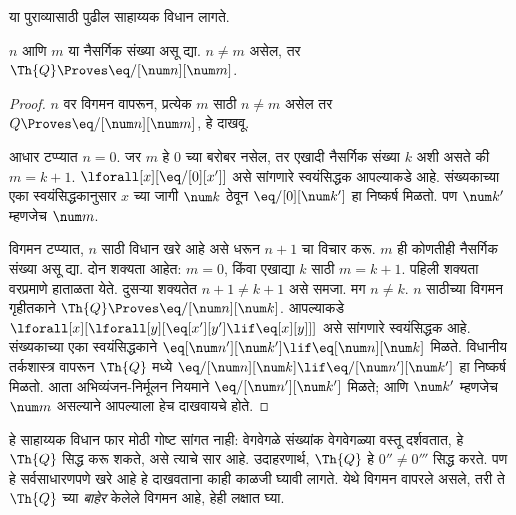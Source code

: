 \documentclass[../../../include/open-logic-section]{subfiles}
\begin{document}
या पुराव्यासाठी पुढील साहाय्यक विधान लागते.

\begin{lem}
 $n$ आणि $m$ या नैसर्गिक संख्या असू द्या.
$n \neq m$ असेल, तर $\Th{Q} \Proves \eq/[\num n][\num m]$.
\end{lem}

\begin{proof}
$n$ वर विगमन वापरून, प्रत्येक $m$ साठी $n \neq m$ असेल तर
$Q \Proves \eq/[\num n][\num m]$, हे दाखवू.

आधार टप्प्यात $n = 0$. जर $m$ हे $0$ च्या बरोबर नसेल,
तर एखादी नैसर्गिक संख्या $k$ अशी असते की $m = k +
1$. $\lforall[x][\eq/[0][x']]$ असे सांगणारे स्वयंसिद्धक
आपल्याकडे आहे. संख्यकाच्या एका स्वयंसिद्धकानुसार $x$ च्या जागी
$\num k$ ठेवून $\eq/[0][\num k']$ हा निष्कर्ष मिळतो. पण
$\num k'$ म्हणजेच $\num m$.

विगमन टप्प्यात, $n$ साठी विधान खरे आहे असे धरून $n+1$ चा
विचार करू. $m$ ही कोणतीही नैसर्गिक संख्या असू द्या. दोन शक्यता
आहेत: $m = 0$, किंवा एखाद्या $k$ साठी $m = k+1$. पहिली
शक्यता वरप्रमाणे हाताळता येते. दुसऱ्या शक्यतेत $n+1 \neq
k+1$ असे समजा. मग $n \neq k$. $n$ साठीच्या विगमन गृहीतकाने
$\Th{Q} \Proves \eq/[\num n][\num k]$. आपल्याकडे
$\lforall[x][\lforall[y][\eq[x'][y'] \lif \eq[x][y]]]$
असे सांगणारे स्वयंसिद्धक आहे. संख्यकाच्या एका स्वयंसिद्धकाने
$\eq[\num n'][\num k'] \lif \eq[\num n][\num
  k]$ मिळते. विधानीय तर्कशास्त्र वापरून $\Th{Q}$ मध्ये
$\eq/[\num n][\num k] \lif \eq/[\num n'][\num k']$
हा निष्कर्ष मिळतो. आता अभिव्यंजन-निर्मूलन नियमाने
$\eq/[\num n'][\num k']$ मिळते; आणि $\num k'$ म्हणजेच
$\num m$ असल्याने आपल्याला हेच दाखवायचे होते.
\end{proof}

\begin{explain}
हे साहाय्यक विधान फार मोठी गोष्ट सांगत नाही: वेगवेगळे संख्यांक
वेगवेगळ्या वस्तू दर्शवतात, हे $\Th{Q}$ सिद्ध करू शकते,
असे त्याचे सार आहे. उदाहरणार्थ, $\Th{Q}$ हे
$0'' \neq 0'''$ सिद्ध करते. पण हे सर्वसाधारणपणे खरे आहे
हे दाखवताना काही काळजी घ्यावी लागते. येथे विगमन वापरले असले,
तरी ते $\Th{Q}$ च्या \emph{बाहेर} केलेले विगमन आहे, हेही लक्षात घ्या.
\end{explain}
\end{document}

